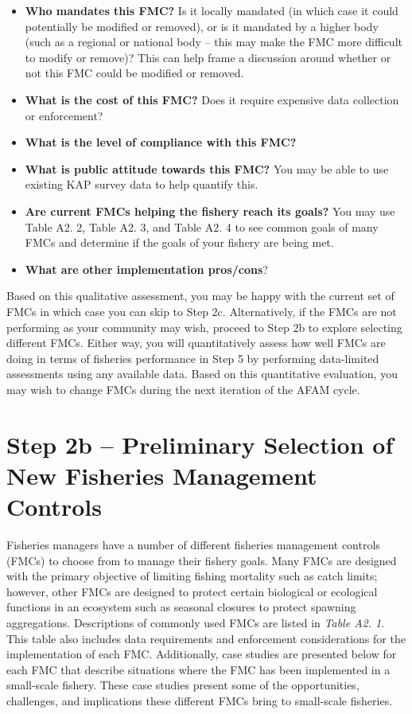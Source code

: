 \documentclass[]{book}
\begin{document}
\begin{itemize}
\item
  \textbf{Who mandates this FMC?} Is it locally mandated (in which case
  it could potentially be modified or removed), or is it mandated by a
  higher body (such as a regional or national body -- this may make the
  FMC more difficult to modify or remove)? This can help frame a
  discussion around whether or not this FMC could be modified or
  removed.
\item
  \textbf{What is the cost of this FMC?} Does it require expensive data
  collection or enforcement?
\item
  \textbf{What is the level of compliance with this FMC?}
\item
  \textbf{What is public attitude towards this FMC?} You may be able to
  use existing KAP survey data to help quantify this.
\item
  \textbf{Are current FMCs helping the fishery reach its goals?} You may
  use Table A2. 2, Table A2. 3, and Table A2. 4 to see common goals of
  many FMCs and determine if the goals of your fishery are being met.
\item
  \textbf{What are other implementation pros/cons}?
\end{itemize}

Based on this qualitative assessment, you may be happy with the current
set of FMCs in which case you can skip to Step 2c. Alternatively, if the
FMCs are not performing as your community may wish, proceed to Step 2b
to explore selecting different FMCs. Either way, you will quantitatively
assess how well FMCs are doing in terms of fisheries performance in Step
5 by performing data-limited assessments using any available data. Based
on this quantitative evaluation, you may wish to change FMCs during the
next iteration of the AFAM cycle.

\section{Step 2b -- Preliminary Selection of New Fisheries Management
Controls}\label{step-2b-preliminary-selection-of-new-fisheries-management-controls}

Fisheries managers have a number of different fisheries management
controls (FMCs) to choose from to manage their fishery goals. Many FMCs
are designed with the primary objective of limiting fishing mortality
such as catch limits; however, other FMCs are designed to protect
certain biological or ecological functions in an ecosystem such as
seasonal closures to protect spawning aggregations. Descriptions of
commonly used FMCs are listed in \emph{Table A2. 1}. This table also
includes data requirements and enforcement considerations for the
implementation of each FMC. Additionally, case studies are presented
below for each FMC that describe situations where the FMC has been
implemented in a small-scale fishery. These case studies present some of
the opportunities, challenges, and implications these different FMCs
bring to small-scale fisheries.
\end{document}
